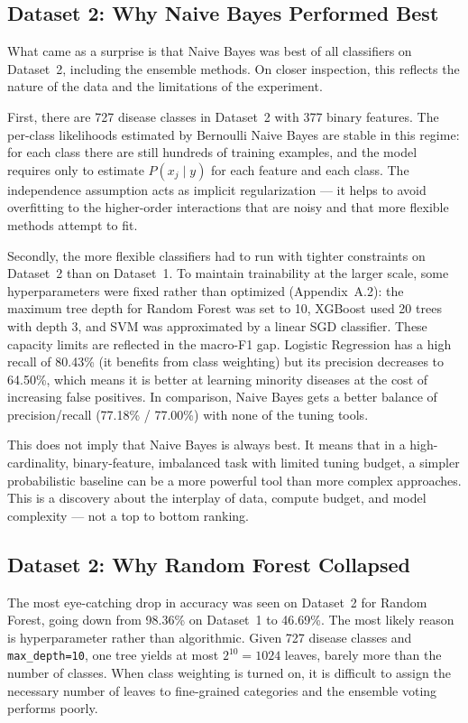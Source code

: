 \subsection{Dataset 2: Why Naive Bayes Performed Best}

What came as a surprise is that Naive Bayes was best of all classifiers on Dataset~2, including the ensemble methods. On closer inspection, this reflects the nature of the data and the limitations of the experiment.

First, there are 727 disease classes in Dataset~2 with 377 binary features. The per-class likelihoods estimated by Bernoulli Naive Bayes are stable in this regime: for each class there are still hundreds of training examples, and the model requires only to estimate $P(x_j \mid y)$ for each feature and each class. The independence assumption acts as implicit regularization --- it helps to avoid overfitting to the higher-order interactions that are noisy and that more flexible methods attempt to fit.

Secondly, the more flexible classifiers had to run with tighter constraints on Dataset~2 than on Dataset~1. To maintain trainability at the larger scale, some hyperparameters were fixed rather than optimized (Appendix~A.2): the maximum tree depth for Random Forest was set to 10, XGBoost used 20 trees with depth 3, and SVM was approximated by a linear SGD classifier. These capacity limits are reflected in the macro-F1 gap. Logistic Regression has a high recall of 80.43\% (it benefits from class weighting) but its precision decreases to 64.50\%, which means it is better at learning minority diseases at the cost of increasing false positives. In comparison, Naive Bayes gets a better balance of precision/recall (77.18\% / 77.00\%) with none of the tuning tools.

This does not imply that Naive Bayes is always best. It means that in a high-cardinality, binary-feature, imbalanced task with limited tuning budget, a simpler probabilistic baseline can be a more powerful tool than more complex approaches. This is a discovery about the interplay of data, compute budget, and model complexity --- not a top to bottom ranking.

\subsection{Dataset 2: Why Random Forest Collapsed}

The most eye-catching drop in accuracy was seen on Dataset~2 for Random Forest, going down from 98.36\% on Dataset~1 to 46.69\%. The most likely reason is hyperparameter rather than algorithmic. Given 727 disease classes and \texttt{max\_depth=10}, one tree yields at most $2^{10} = 1024$ leaves, barely more than the number of classes. When class weighting is turned on, it is difficult to assign the necessary number of leaves to fine-grained categories and the ensemble voting performs poorly.

